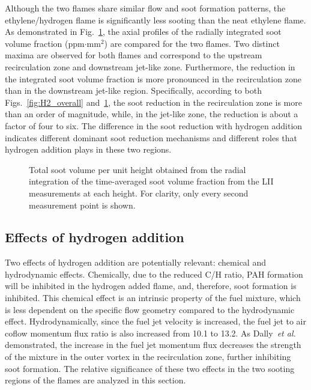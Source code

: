 \documentclass[review,3p,times]{elsarticle}
\begin{document}
Although the two flames share similar flow and soot formation patterns, the ethylene/hydrogen flame is significantly less sooting than the neat ethylene flame.  As demonstrated in Fig.~\ref{fig:ifv}, the axial profiles of the radially integrated soot volume fraction (ppm$\cdot$mm$^2$) are compared for the two flames.  Two distinct maxima are observed for both flames and correspond to the upstream recirculation zone and downstream jet-like zone.  Furthermore, the reduction in the integrated soot volume fraction is more pronounced in the recirculation zone than in the downstream jet-like region.  Specifically, according to both Figs.~\ref{fig:H2_overall} and~\ref{fig:ifv}, the soot reduction in the recirculation zone is more than an order of magnitude, while, in the jet-like zone, the reduction is about a factor of four to six.  The difference in the soot reduction with hydrogen addition indicates different \textcolor{Rv1}{dominant} soot reduction mechanisms and different roles that hydrogen addition plays in these two regions.  

\begin{figure}[t]
  \centering
  \scriptsize
  \vspace{-0.10in}
  \resizebox{0.5\textwidth}{!}{}
  \normalsize
  \vspace{-0.3in}
  \caption{Total soot volume per unit height obtained from the radial integration of the time-averaged soot volume fraction from the LII measurements at each height.  For clarity, only every second measurement point is shown.}
  \label{fig:ifv}
\end{figure}


\subsection{Effects of hydrogen addition}

Two effects of hydrogen addition are potentially relevant: chemical and hydrodynamic effects.  Chemically, due to the reduced C/H ratio, PAH formation will be inhibited in the hydrogen added flame, and, therefore, soot formation is inhibited.  \textcolor{Rv1}{This chemical effect is an intrinsic property of the fuel mixture, which is less dependent on the specific flow geometry compared to the hydrodynamic effect.  }Hydrodynamically, since the fuel jet velocity is increased, the fuel jet to air coflow momentum flux ratio is also increased \textcolor{Rv1}{from 10.1 to 13.2}.  As Dally~\emph{et al.}~\cite{dally98b} demonstrated, the increase in the fuel jet momentum flux decreases the strength of the mixture in the outer vortex in the recirculation zone, further inhibiting soot formation.  The relative significance of these two effects in the two sooting regions of the flames are analyzed in this section.
\end{document}
